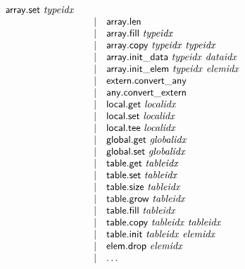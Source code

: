$$\begin{array}{@{}lrrl@{}l@{}}
\mathsf{array.set}~{\mathit{typeidx}} \\ &&|&
\mathsf{array.len} \\ &&|&
\mathsf{array.fill}~{\mathit{typeidx}} \\ &&|&
\mathsf{array.copy}~{\mathit{typeidx}}~{\mathit{typeidx}} \\ &&|&
\mathsf{array.init\_data}~{\mathit{typeidx}}~{\mathit{dataidx}} \\ &&|&
\mathsf{array.init\_elem}~{\mathit{typeidx}}~{\mathit{elemidx}} \\ &&|&
\mathsf{extern.convert\_any} \\ &&|&
\mathsf{any.convert\_extern} \\ &&|&
\mathsf{local.get}~{\mathit{localidx}} \\ &&|&
\mathsf{local.set}~{\mathit{localidx}} \\ &&|&
\mathsf{local.tee}~{\mathit{localidx}} \\ &&|&
\mathsf{global.get}~{\mathit{globalidx}} \\ &&|&
\mathsf{global.set}~{\mathit{globalidx}} \\ &&|&
\mathsf{table.get}~{\mathit{tableidx}} \\ &&|&
\mathsf{table.set}~{\mathit{tableidx}} \\ &&|&
\mathsf{table.size}~{\mathit{tableidx}} \\ &&|&
\mathsf{table.grow}~{\mathit{tableidx}} \\ &&|&
\mathsf{table.fill}~{\mathit{tableidx}} \\ &&|&
\mathsf{table.copy}~{\mathit{tableidx}}~{\mathit{tableidx}} \\ &&|&
\mathsf{table.init}~{\mathit{tableidx}}~{\mathit{elemidx}} \\ &&|&
\mathsf{elem.drop}~{\mathit{elemidx}} \\ &&|&
\dots \\
\end{array}
$$

\vspace{1ex}

